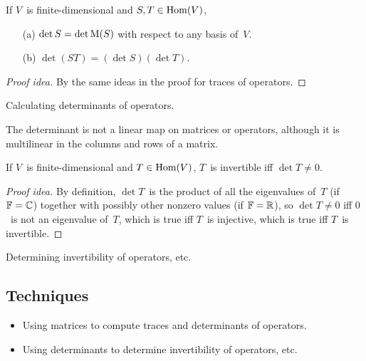 \begin{thm}
If \(V\)~is finite-dimensional and \(S,T\in\operatorname{Hom}(V)\),
\begin{enumerate}[itemsep=0pt]
\item[(a)] \(\det S=\det\operatorname{M}(S)\) with respect to any basis of~\(V\).
\item[(b)] \(\det(ST)=(\det S)(\det T)\).
\end{enumerate}
\end{thm}
\begin{proof}[Proof idea]
By the same ideas in the proof for traces of operators.
\end{proof}
\begin{app}
Calculating determinants of operators.
\end{app}

\begin{rmk}
The determinant is not a linear map on matrices or operators, although it is multilinear in the columns and rows of a matrix.
\end{rmk}

\begin{thm}
If \(V\)~is finite-dimensional and \(T\in\operatorname{Hom}(V)\), \(T\)~is invertible iff \(\det T\ne0\).
\end{thm}
\begin{proof}[Proof idea]
By definition, \(\det T\)~is the product of all the eigenvalues of~\(T\) (if \(\mathbb{F}=\mathbb{C}\)) together with possibly other nonzero values (if \(\mathbb{F}=\mathbb{R}\)), so \(\det T\ne0\) iff \(0\)~is not an eigenvalue of~\(T\), which is true iff \(T\)~is injective, which is true iff \(T\)~is invertible.
\end{proof}
\begin{app}
Determining invertibility of operators, etc.
\end{app}

\subsection*{Techniques}
\begin{itemize}[itemsep=0pt]
\item Using matrices to compute traces and determinants of operators.
\item Using determinants to determine invertibility of operators, etc.
\end{itemize}
